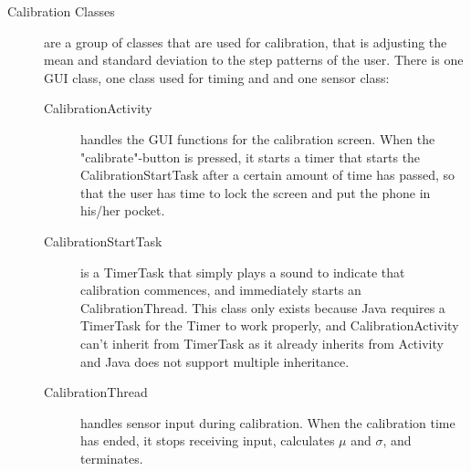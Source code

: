 \begin{description}
\item[Calibration Classes]
are a group of classes that are used for calibration, that is adjusting the mean and standard deviation to the step patterns of the user. There is one GUI class, one class used for timing and and one sensor class:
\begin{description}
\item[CalibrationActivity]
handles the GUI functions for the calibration screen. When the "calibrate"-button is pressed, it starts a timer that starts the CalibrationStartTask after a certain amount of time has passed, so that the user has time to lock the screen and put the phone in his/her pocket.
\item[CalibrationStartTask]
is a TimerTask that simply plays a sound to indicate that calibration commences, and immediately starts an CalibrationThread. This class only exists because Java requires a TimerTask for the Timer to work properly, and CalibrationActivity can't inherit from TimerTask as it already inherits from Activity and Java does not support multiple inheritance. 
\item[CalibrationThread]
handles sensor input during calibration. When the calibration time has ended, it stops receiving input, calculates $\mu$ and $\sigma$, and terminates.
\end{description}
 
\end{description}


